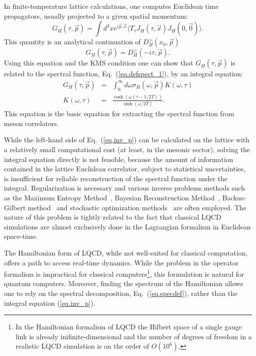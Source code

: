 \documentclass[11pt]{article}
\begin{document}
In finite-temperature lattice calculations, one computes
Euclidean time propagators, usually
projected to a given spatial momentum:
\begin{equation}
G_H(\tau, \vec{p}) = \int d^3x e^{i \vec{p}.\vec{x}}
\langle T_{\tau} J_H(\tau, \vec{x}) J_H(0,
\vec{0}) \rangle.
\end{equation}
This quantity is an analytical continuation
of $D^{>}_H(x_0,\vec{p})$
\begin{equation}
G_H(\tau,\vec{p})=D^{>}_H(-i\tau,\vec{p}).
\end{equation}
Using this equation and the KMS condition
one can
show that $G_H(\tau,\vec{p})$ is related to the
spectral
function, Eq.~(\ref{eq.defspect_1}), by an integral equation:
\begin{eqnarray}
G_H(\tau, \vec{p}) &=& \int_0^{\infty} d \omega
\sigma_H(\omega,\vec{p}) K(\omega, \tau) \label{eq.spect} \label{eq.inv_p}\\
K(\omega, \tau) &=& \frac{\cosh(\omega(\tau-1/2
T))}{\sinh(\omega/2 T)}.
\label{eq.kernel}
\end{eqnarray}
This equation is the basic equation for extracting the spectral
function from meson correlators.

While the left-hand side of Eq.~(\ref{eq.inv_p}) can be calculated on the
lattice with a relatively small computational cost (at least, in the mesonic
sector), solving the integral equation directly is not feasible, because the
amount of information contained in the lattice Euclidean correlator,
subject to statistical uncertainties, is insufficient
for reliable reconstruction of the spectral function
under the integral. Regularization is necessary and various inverse problems
methods such as the Maximum Entropy Method~\cite{Jarrell:1996rrw},
Bayesian Reconstruction Method~\cite{Burnier:2013nla},
Backus-Gilbert method~\cite{Bulava:2019kbi} and
stochastic optimization methods~\cite{Ding:2017std}
are often employed.
The nature of this problem is tightly related to the fact that classical
LQCD simulations are almost exclusively done in the Lagrangian formalism
in Euclidean space-time.

The Hamiltonian form of LQCD, while not well-suited for classical computation,
offers a path to access real-time dynamics. While the problem in the operator
formalism is impractical for classical computers\footnote{In the Hamiltonian
formalism of LQCD the Hilbert space of a single gauge link is already
inifinite-dimensional and the number of degrees of freedom in a realistic
LQCD simulation is on the order of $O(10^6)$.}, this formulation is natural
for quantum computers. Moreover, finding the spectrum of the Hamiltonian
allows one to rely on the spectral decomposition, Eq.~(\ref{eq.specdef}), rather
than the integral equation (\ref{eq.inv_p}).
\end{document}
